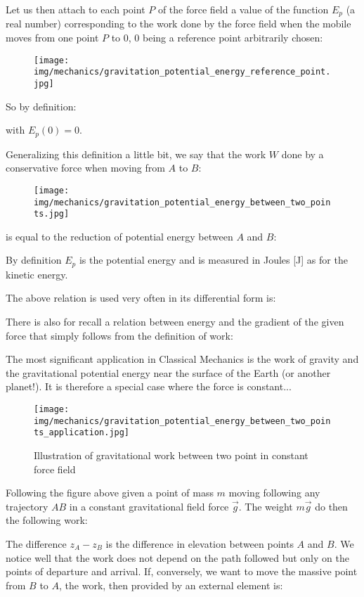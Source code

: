 	Let us then attach to each point $P$ of the force field a value of the function $E_p$ (a real number) corresponding to the work done by the force field when the mobile moves from one point $P$ to $0$, $0$ being a reference point arbitrarily chosen:
	\begin{figure}[H]
		\centering
		\texttt{[image: img/mechanics/gravitation\_potential\_energy\_reference\_point.jpg]}
	\end{figure}
	So by definition:
	
	with $E_p(0)=0$.
	
	Generalizing this definition a little bit, we say that the work $W$ done by a conservative force when moving from $A$ to $B$:
	\begin{figure}[H]
		\centering
		\texttt{[image: img/mechanics/gravitation\_potential\_energy\_between\_two\_points.jpg]}
	\end{figure}
	is equal to the reduction of potential energy between $A$ and $B$:
	
	By definition $E_p$ is the potential energy and is measured in Joules [J] as for the kinetic energy.

	The above relation is used very often in its differential form is:
	
	There is also for recall a relation between energy and the gradient of the given force that simply follows from the definition of work:
	
	The most significant application in Classical Mechanics is the work of gravity and the gravitational potential energy near the surface of the Earth (or another planet!). It is therefore a special case where the force is constant...
	\begin{figure}[H]
		\centering
		\texttt{[image: img/mechanics/gravitation\_potential\_energy\_between\_two\_points\_application.jpg]}
		\caption[]{Illustration of gravitational work between two point in constant force field}
	\end{figure}
	Following the figure above given a point of mass $m$ moving following any trajectory $AB$ in a constant gravitational field force $\vec{g}$. The weight $m\vec{g}$ do then the following work:
	
	The difference $z_A-z_B$ is the difference in elevation between points $A$ and $B$. We notice well that the work does not depend on the path followed but only on the points of departure and arrival. If, conversely, we want to move the massive point from $B$ to $A$, the work, then provided by an external element is:
	
